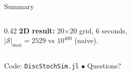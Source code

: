 \documentclass[10pt,aspectratio=169]{beamer}
\begin{document}
\begin{frame}{Summary}
\begin{columns}[T]
\begin{column}{0.42\textwidth}
  \bigskip
  \textbf{2D result:} 20$\times$20 grid, 6 seconds,\\
  $|\mathcal{S}|_{\max} = 2529$ vs $10^{400}$ (naive).
\end{column}
\end{columns}

\vspace{0.5em}
\begin{center}
  {\small Code: \texttt{DiscStochSim.jl} \quad $\bullet$ \quad
  Questions?}
\end{center}
\end{frame}
\end{document}
